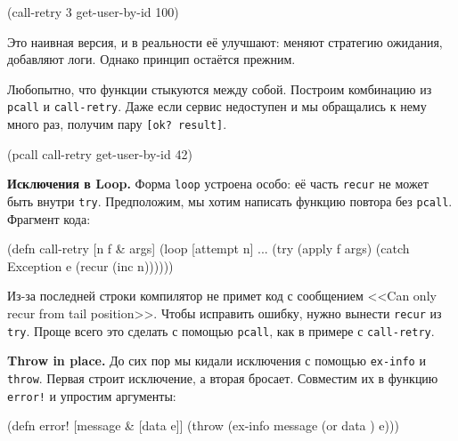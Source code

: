 \begin{english}
  \begin{clojure}
(call-retry 3 get-user-by-id 100)
  \end{clojure}
\end{english}

Это наивная версия, и в реальности её улучшают: меняют стратегию ожидания,
добавляют логи. Однако принцип остаётся прежним.

Любопытно, что функции стыкуются между собой. Построим комбинацию из
\verb|pcall| и \verb|call-retry|. Даже если сервис недоступен и мы обращались к
нему много раз, получим пару \verb|[ok? result]|.

\begin{english}
  \begin{clojure}
(pcall call-retry get-user-by-id 42)
  \end{clojure}
\end{english}

\textbf{Исключения в Loop.} Форма \verb|loop| устроена особо: её часть
\verb|recur| не может быть внутри \verb|try|. Предположим, мы хотим написать
функцию повтора без \verb|pcall|. Фрагмент кода:


\begin{english}
  \begin{clojure}
(defn call-retry [n f & args]
  (loop [attempt n]
    ...
    (try
      (apply f args)
      (catch Exception e
        (recur (inc n))))))
  \end{clojure}
\end{english}

Из-за последней строки компилятор не примет код с сообщением <<Can only recur
from tail position>>. Чтобы исправить ошибку, нужно вынести \verb|recur| из
\verb|try|. Проще всего это сделать с помощью \verb|pcall|, как в примере с
\verb|call-retry|.

\textbf{Throw in place.} До сих пор мы кидали исключения с помощью
\verb|ex-info| и \verb|throw|. Первая строит исключение, а вторая
бросает. Совместим их в функцию \verb|error!| и упростим аргументы:


\ifnarrow

\begin{english}
  \begin{clojure}
(defn error! [message & [data e]]
  (throw (ex-info message
           (or data {}) e)))
  \end{clojure}
\end{english}

